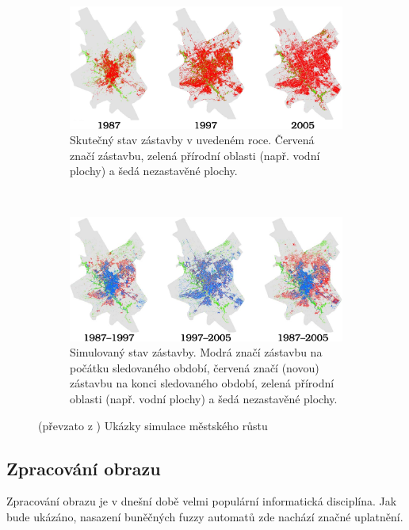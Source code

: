 \documentclass[a4paper,10pt]{article}
\begin{document}
\begin{figure}[]
    \begin{subfigure}[t]{\textwidth} \centering
      \includegraphics[width=\textwidth]{urban-growt-city-1}
      \caption{Skutečný stav zástavby v uvedeném roce. Červená značí zástavbu, zelená přírodní oblasti (např. vodní plochy) a šedá nezastavěné plochy.} 
    \end{subfigure}
    \\
    \begin{subfigure}[t]{\textwidth} \centering
      \includegraphics[width=\textwidth]{urban-growt-city-2}
      \caption{Simulovaný stav zástavby. Modrá značí zástavbu na počátku sledovaného období, červená značí (novou) zástavbu na konci sledovaného období, zelená přírodní oblasti (např. vodní plochy) a šedá nezastavěné plochy.} 
    \end{subfigure}

    \caption[Ukázky simulace městského růstu]{(převzato z \cite{Ahm+-CalFuzCelAutModUrbDynSauAr}) Ukázky simulace městského růstu} \label{img-UrbGroProSample}
\end{figure}

\subsection{Zpracování obrazu}
Zpracování obrazu je v dnešní době velmi populární informatická disciplína. Jak bude ukázáno, nasazení buněčných fuzzy automatů zde nachází značné uplatnění.
\end{document}

